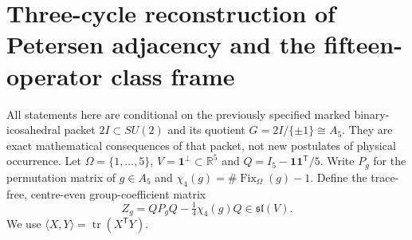 \documentclass[11pt]{article}
\begin{document}
\section{Three-cycle reconstruction of Petersen adjacency and the fifteen-operator class frame}
\label{p1:sec:v342-three-cycle-operator-reconstruction}
All statements here are conditional on the previously specified marked
binary-icosahedral packet $2I\subset SU(2)$ and its quotient
$G=2I/\{\pm1\}\cong A_5$.  They are exact mathematical consequences
of that packet, not new postulates of physical occurrence.
Let $\Omega=\{1,\ldots,5\}$,
$V=\mathbf1^\perp\subset\mathbb R^5$ and
$Q=I_5-\mathbf1\mathbf1^{\mathsf T}/5$.
Write $P_g$ for the permutation matrix of $g\in A_5$ and
$\chi_4(g)=\#\operatorname{Fix}_{\Omega}(g)-1$.  Define the
trace-free, centre-even group-coefficient matrix
\[
 Z_g=QP_gQ-\tfrac14\chi_4(g)Q\in\mathfrak{sl}(V).
\]
We use $\langle X,Y\rangle=\operatorname{tr}(X^{\mathsf T}Y)$.
\end{document}
